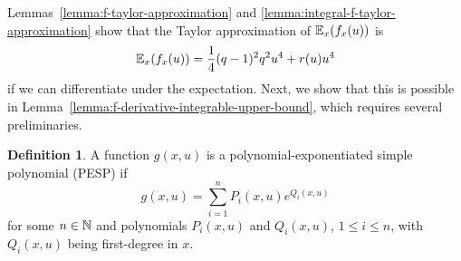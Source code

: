 \documentclass{article}
\theoremstyle{plain}
\theoremstyle{definition}
\newtheorem{definition}[theorem]{Definition}
\theoremstyle{remark}
\begin{document}
Lemmas~\ref{lemma:f-taylor-approximation} and \ref{lemma:integral-f-taylor-approximation}
show that the Taylor approximation of $\operatorname{\mathbb{E}}_x(f_x(u))$ is 
\begin{equation}
    \operatorname{\mathbb{E}}_x(f_x(u)) = \frac{1}{4}(q - 1)^2q^2u^4 + r(u)u^4
\end{equation}
if we can differentiate under the expectation. Next, we show that this is possible in 
Lemma~\ref{lemma:f-derivative-integrable-upper-bound}, which requires several preliminaries.

\begin{definition}
    A function $g(x, u)$ is a polynomial-exponentiated simple polynomial (PESP) if
    \begin{equation}
        g(x, u) = \sum_{i=1}^n P_i(x, u)e^{Q_i(x, u)}
    \end{equation}
    for some $n\in \mathbb{N}$ and polynomials $P_i(x, u)$ and $Q_i(x, u)$, $1\leq i \leq n$, with $Q_i(x, u)$
    being first-degree in $x$.
\end{definition}
\end{document}
